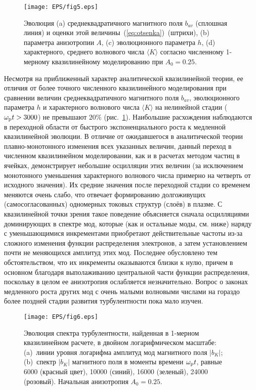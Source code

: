 \begin{figure}[b]
\centering
\texttt{[image: EPS/fig5.eps]}
\caption{Эволюция (a) среднеквадратичного магнитного поля $b_{av}$ (сплошная линия) и оценки этой величины~(\ref{eq:otsenka})~(штрихи), (b) параметра анизотропии $A$, (c) эволюционного параметра $h$, (d) характерного, среднего волнового числа $\langle K\rangle$ согласно численному 1-мерному квазилинейному моделированию при $A_0=0.25$.}
\label{fig:evol1d_QL_A025}
\end{figure}
Несмотря на приближенный характер аналитической квазилинейной теории, ее отличия от более точного численного квазилинейного моделирования при сравнении величин среднеквадратичного магнитного поля $b_{av}$, эволюционного параметра $h$ и характерного волнового числа $\langle K\rangle$ на нелинейной стадии ($\omega_\mathrm{p} t > 3000$) не превышают $20\%$ (рис.~\ref{fig:evol1d_QL_A025}). Наибольшие расхождения наблюдаются в переходной области от быстрого экспоненциального роста к медленной квазилинейной эволюции. В отличие от ожидавшегося в аналитической теории плавно-монотонного изменения всех указанных величин, данный переход в численном квазилинейном моделировании, как и в расчетах методом частиц в ячейках, демонстрирует небольшие осцилляции этих величин (за исключением монотонного уменьшения характерного волнового числа примерно на четверть от исходного значения). Их средние значения после переходной стадии со временем меняются очень слабо, что отвечает формированию долгоживущих (самосогласованных) одномерных токовых структур (слоёв) в плазме. С квазилинейной точки зрения такое поведение объясняется сначала осцилляциями доминирующих в спектре мод, которые (как и остальные моды, см. ниже) наряду с уменьшающимися инкрементами приобретают действительные частоты из-за сложного изменения функции распределения электронов, а затем установлением почти не меняющихся амплитуд этих мод. Последнее обусловлено тем обстоятельством, что их инкременты оказываются близки к нулю, причем в основном благодаря выполаживанию центральной части функции распределения, поскольку в целом ее анизотропия ослабляется незначительно. Вопрос о законах медленного роста других мод с очень малыми волновыми числами на гораздо более поздней стадии развития турбулентности пока мало изучен.





\begin{figure}[t]
\centering
\texttt{[image: EPS/fig6.eps]}
\caption{Эволюция спектра турбулентности, найденная в 1-мерном квазилинейном расчете, в двойном логарифмическом масштабе: (a)~линии уровня логарифма амплитуд мод магнитного поля $|b_K|$; 
(b)~спектр $|b_K|$ магнитного поля в моменты времени $\omega_\mathrm{p} t$, равные 6000 (красный цвет), 10000 (синий), 16000 (зеленый), 24000 (розовый). Начальная анизотропия $A_0=0.25$.}
\label{fig:dinspectrA025_1d}
\end{figure}

